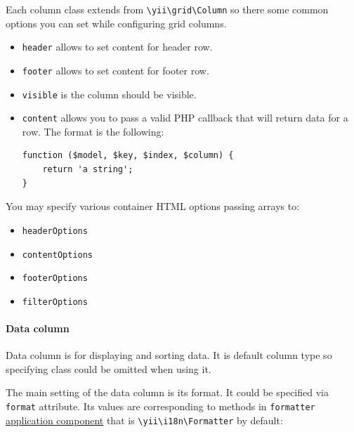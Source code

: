 Each column class extends from \texttt{{\allowbreak{}\textbackslash}yii{\allowbreak{}\textbackslash}grid{\allowbreak{}\textbackslash}Column} so there some common options you can set while configuring
grid columns.

\begin{itemize}
\item \lstinline|header| allows to set content for header row.
\item \lstinline|footer| allows to set content for footer row.
\item \lstinline|visible| is the column should be visible.
\item \lstinline|content| allows you to pass a valid PHP callback that will return data for a row. The format is the following:

\lstset{language=php}\begin{lstlisting}
function ($model, $key, $index, $column) {
    return 'a string';
}
\end{lstlisting}

\end{itemize}
You may specify various container HTML options passing arrays to:

\begin{itemize}
\item \lstinline|headerOptions|
\item \lstinline|contentOptions|
\item \lstinline|footerOptions|
\item \lstinline|filterOptions|
\end{itemize}
\paragraph{Data column \label{output-data-widgets.md::data-column}}
Data column is for displaying and sorting data. It is default column type so specifying class could be omitted when
using it.

The main setting of the data column is its format. It could be specified via \lstinline|format| attribute. Its values are
corresponding to methods in \lstinline|formatter| \hyperref[structure-application-components.md]{application component} that is \texttt{{\allowbreak{}\textbackslash}yii{\allowbreak{}\textbackslash}i18n{\allowbreak{}\textbackslash}Formatter} by default:

